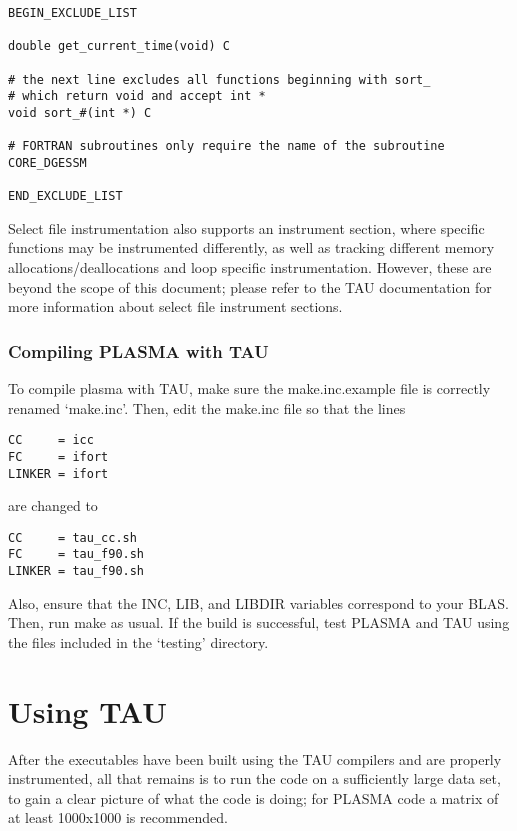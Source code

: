 \documentclass[11pt,letterpaper]{article}
\begin{document}
\begin{verbatim}
BEGIN_EXCLUDE_LIST

double get_current_time(void) C

# the next line excludes all functions beginning with sort_
# which return void and accept int *
void sort_#(int *) C

# FORTRAN subroutines only require the name of the subroutine
CORE_DGESSM

END_EXCLUDE_LIST
\end{verbatim}

Select file instrumentation also supports an instrument section, where specific functions may be instrumented differently, as well as tracking different memory allocations/deallocations and loop specific instrumentation. However, these are beyond the scope of this document; please refer to the TAU documentation for more information about select file instrument sections.

\subsubsection{Compiling PLASMA with TAU}
To compile plasma with TAU, make sure the make.inc.example file is correctly renamed `make.inc'. Then, edit the make.inc file so that the lines

\begin{verbatim}
CC     = icc
FC     = ifort
LINKER = ifort
\end{verbatim}

are changed to

\begin{verbatim}
CC     = tau_cc.sh
FC     = tau_f90.sh
LINKER = tau_f90.sh
\end{verbatim}

Also, ensure that the INC, LIB, and LIBDIR variables correspond to your BLAS. Then, run make as usual. If the build is successful, test PLASMA and TAU using the files included in the `testing' directory.


\section{Using TAU}
After the executables have been built using the TAU compilers and are properly instrumented, all that remains is to run the code on a sufficiently large data set, to gain a clear picture of what the code is doing; for PLASMA code a matrix of at least 1000x1000 is recommended.
\end{document}
